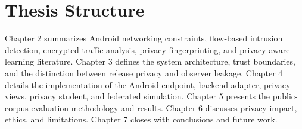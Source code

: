 \section{Thesis Structure}
Chapter 2 summarizes Android networking constraints, flow-based intrusion detection,
encrypted-traffic analysis, privacy fingerprinting, and privacy-aware learning literature. Chapter 3
defines the system architecture, trust boundaries, and the distinction between release privacy and
observer leakage. Chapter 4 details the implementation of the Android endpoint, backend adapter,
privacy views, privacy student, and federated simulation. Chapter 5 presents the public-corpus
evaluation methodology and results. Chapter 6 discusses privacy impact, ethics, and limitations.
Chapter 7 closes with conclusions and future work.
